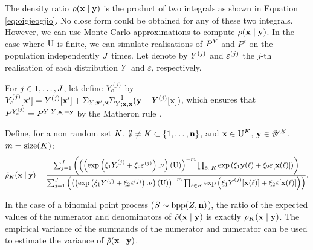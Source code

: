



The density ratio $\rho(\mathbf{x}\mid\mathbf{y})$ is the product of  two integrals as shown in Equation \eqref{eq:oigjeogjio}. No close form could be obtained for any of these two integrals. However, we can use Monte Carlo approximations to compute $\rho(\mathbf{x}\mid\mathbf{y})$.
In the case where $\mathrm{U}$ is finite, we can simulate realisations of $P^Y$ and  $P^\varepsilon$ on the population independently $J$ times.
Let denote by $Y^{(j)}$  and $\varepsilon^{(j)}$ the $j$-th realisation of each distribution $Y$ and $\varepsilon$, respectively.

For $j \in 1,\ldots,J$, let define $Y_c^{(j)}$ by 
$Y_c^{(j)}[\mathbf{x}']=Y^{(j)}[\mathbf{x}']+\Sigma_{Y;\mathbf{x}',\mathbf{x}}\Sigma_{Y;\mathbf{x},\mathbf{x}}^{-1}(\mathbf{y}-Y^{(j)}[\mathbf{x}])$, which ensures that 
$P^{Y_c^{(j)}}=P^{Y\mid Y[\mathbf{x}]=\mathbf{y}}$ by the Matheron rule \citep{wilson2020pathwise, doucet2010note}.

Define, for a non random set $K$,  $\emptyset\neq K\subset\{1,\ldots,\mathbf{n}\}$, 
and $\mathbf{x}\in\mathrm{U}^K$, $\mathbf{y}\in\mathscr{Y}^K$, $m=\mathrm{size}(K)$:
$$\tilde{\rho}_{K}(\mathbf{x}\mid\mathbf{y})=
\frac{\sum_{j=1}^J 
    \left(\left(
    \left(\exp\left(\xi_1Y_c^{(j)}+\xi_2\varepsilon^{(j)}\right).\nu\right)(\mathrm{U})\right)^{-m}\prod_{\ell\in K}\exp\left(\xi_1\mathbf{y}(\ell)+\xi_2\varepsilon[\mathbf{x}(\ell)]\right)
    \right)}{\sum_{j=1}^J 
    \left(\left(
    \left(\exp\left(\xi_1Y^{(j)}+\xi_2\varepsilon^{(j)}\right).\nu\right)(\mathrm{U})\right)^{-m}\prod_{\ell\in K}\exp\left(\xi_1Y_{\phantom{c}}^{(j)}[\mathbf{x}(\ell)]+\xi_2\varepsilon[\mathbf{x}(\ell)]\right)
    \right)}.$$

In the case of a binomial point process ($S\sim\mathrm{bpp}(Z,\mathbf{n})$), the ratio of the expected values of the numerator and denominators of $\tilde{\rho}(\mathbf{x}\mid\mathbf{y})$ is exactly $\rho_K(\mathbf{x}\mid\mathbf{y})$.
The empirical variance of the summands of the numerator and numerator can be used to estimate the variance of $\tilde{\rho}(\mathbf{x}\mid \mathbf{y})$.



